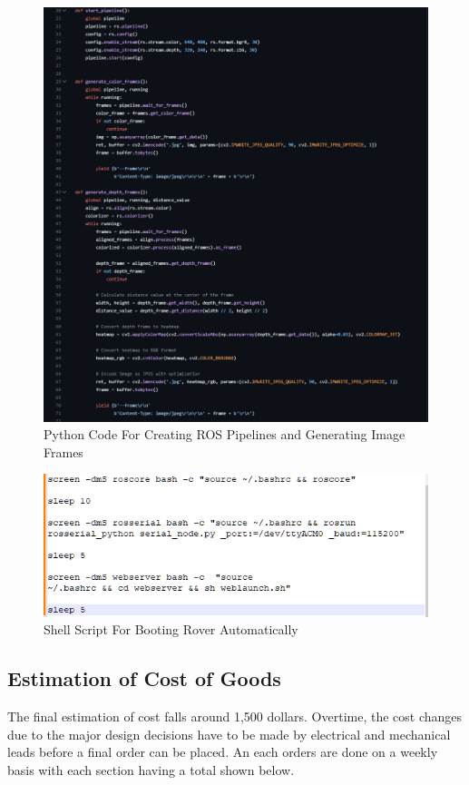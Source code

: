 \documentclass[a4paper, 10pt]{article}
\begin{document}
    \begin{figure} [!h]
			\centering
			\includegraphics[scale=0.5]{Photos/ROSCodeTier3.png}
			\caption{Python Code For Creating ROS Pipelines and Generating Image Frames}
			\label{tier3_code}
	\end{figure}
    \begin{figure} [!h]
			\centering
			\includegraphics[scale=0.5]{Photos/ROSLaunchCodeTier3.png}
			\caption{Shell Script For Booting Rover Automatically}
			\label{tier3_launch}
	\end{figure}
    
 


    \clearpage
	\subsection{Estimation of Cost of Goods}
	The final estimation of cost falls around 1,500 dollars. Overtime, the cost changes due to the major design decisions have to be made by electrical and mechanical leads before a final order can be placed. An each orders are done on a weekly basis with each section having a total shown below. 
	
\end{document}
